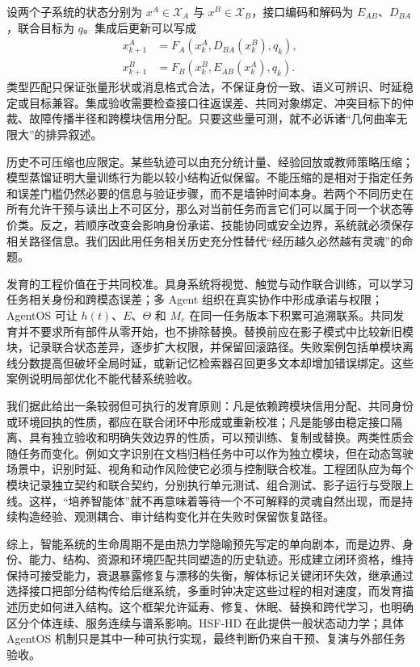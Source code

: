 设两个子系统的状态分别为 $x^A\in\mathcal X_A$ 与 $x^B\in\mathcal X_B$，接口编码和解码为 $E_{AB}$、$D_{BA}$，联合目标为 $q$。集成后更新可以写成
\begin{equation}
\begin{aligned}
    x^A_{k+1}&=F_A(x^A_k,D_{BA}(x^B_k),q_k),\\
    x^B_{k+1}&=F_B(x^B_k,E_{AB}(x^A_k),q_k).
\end{aligned}
\end{equation}
类型匹配只保证张量形状或消息格式合法，不保证身份一致、语义可辨识、时延稳定或目标兼容。集成验收需要检查接口往返误差、共同对象绑定、冲突目标下的仲裁、故障传播半径和跨模块信用分配。只要这些量可测，就不必诉诸“几何曲率无限大”的排异叙述。

历史不可压缩也应限定。某些轨迹可以由充分统计量、经验回放或教师策略压缩；模型蒸馏证明大量训练行为能以较小结构近似保留。不能压缩的是相对于指定任务和误差门槛仍然必要的信息与验证步骤，而不是墙钟时间本身。若两个不同历史在所有允许干预与读出上不可区分，那么对当前任务而言它们可以属于同一个状态等价类。反之，若顺序改变会影响身份承诺、技能协同或安全边界，系统就必须保存相关路径信息。我们因此用任务相关历史充分性替代“经历越久必然越有灵魂”的命题。

发育的工程价值在于共同校准。具身系统将视觉、触觉与动作联合训练，可以学习任务相关身份和跨模态误差；多 Agent 组织在真实协作中形成承诺与权限；AgentOS 可让 $h(t)$、$E$、$\Theta$ 和 $M_e$ 在同一任务版本下积累可追溯联系。共同发育并不要求所有部件从零开始，也不排除替换。替换前应在影子模式中比较新旧模块，记录联合状态差异，逐步扩大权限，并保留回滚路径。失败案例包括单模块离线分数提高但破坏全局时延，或新记忆检索器召回更多文本却增加错误绑定。这些案例说明局部优化不能代替系统验收。

我们据此给出一条较弱但可执行的发育原则：凡是依赖跨模块信用分配、共同身份或环境回执的性质，都应在联合闭环中形成或重新校准；凡是能够由稳定接口隔离、具有独立验收和明确失效边界的性质，可以预训练、复制或替换。两类性质会随任务而变化。例如文字识别在文档归档任务中可以作为独立模块，但在动态驾驶场景中，识别时延、视角和动作风险使它必须与控制联合校准。工程团队应为每个模块记录独立契约和联合契约，分别执行单元测试、组合测试、影子运行与受限上线。这样，“培养智能体”就不再意味着等待一个不可解释的灵魂自然出现，而是持续构造经验、观测耦合、审计结构变化并在失败时保留恢复路径。

综上，智能系统的生命周期不是由热力学隐喻预先写定的单向剧本，而是边界、身份、能力、结构、资源和环境匹配共同塑造的历史轨迹。形成建立闭环资格，维持保持可接受能力，衰退暴露修复与漂移的失衡，解体标记关键闭环失效，继承通过选择接口把部分结构传给后继系统，多重时钟决定这些过程的相对速度，而发育描述历史如何进入结构。这个框架允许延寿、修复、休眠、替换和跨代学习，也明确区分个体连续、服务连续与谱系影响。HSF-HD 在此提供一般状态动力学；具体 AgentOS 机制只是其中一种可执行实现，最终判断仍来自干预、复演与外部任务验收。

